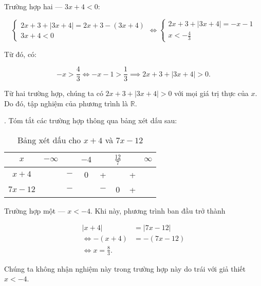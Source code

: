 \textcolor{colorEmphasis}{Trường hợp hai --- $3x + 4 < 0$}:

\begin{equation*}
   \begin{cases}
      2x + 3 + |3x + 4| = 2x + 3 - (3x + 4) \\
      3x + 4 < 0
   \end{cases} \iff \begin{cases}
      2x + 3 + |3x + 4| = -x - 1 \\
      x < -\frac{4}{3}
   \end{cases}
\end{equation*}

Từ đó, có:

\begin{equation*}
   -x > \frac{4}{3} \iff -x - 1 > \frac{1}{3} \implies 2x + 3 + |3x + 4| > 0.
\end{equation*}

Từ hai trường hợp, chúng ta có $2x + 3 + |3x + 4| > 0$ với mọi giá trị thực của $x$. Do đó, tập nghiệm của phương trình là $\mathbb{R}$.

. Tóm tắt các trường hợp thông qua bảng xét dấu sau:

\begin{table}[H]
   \centering
   \begin{tabular}{|c|ccccccc|}
   \hline
   $x$          & $-\infty$ &     & $-4$ &     & $\frac{12}{7}$ &   & $\infty$ \\
   \hline
   $x+4$        &           & $-$ &  0  &  +  &     & + &           \\
   \hline
   $7x-12$        &           & $-$ &     & $-$ &  0  & + &           \\
   \hline
   \end{tabular}
   \caption{Bảng xét dấu cho $x+4$ và $7x-12$}
   \label{tab:toan_hoc_nen_tang:ham_so_mot_bien:ham_tung_phan:gpt7}
\end{table}

\textcolor{colorEmphasisCyan}{Trường hợp một --- $x < -4$}. Khi này, phương trình ban đầu trở thành

\begin{align*}
   |x + 4| &= |7x - 12| \\
   \iff -(x + 4) &= -(7x - 12) \\
   \iff x = \frac{8}{3}.
\end{align*}

Chúng ta không nhận nghiệm này trong trường hợp này do trái với giả thiết $x < -4$.

